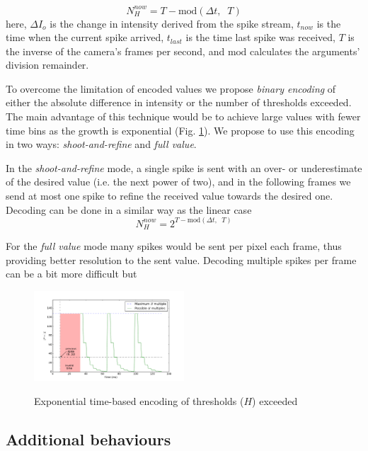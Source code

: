 \documentclass[twocolumn]{article}
\begin{document}
\begin{equation}
 N_{H}^{now} = T - \mathrm{mod}\left(\Delta t, \;\; T\right)
 \label{eq:new_Nh_linear}
\end{equation}
here, $\Delta I_o$ is the change in intensity derived from the spike stream, $t_{now}$ is the time when the current spike arrived, $t_{last}$ is the time last spike was received, $T$ is the inverse of the camera's frames per second, and $\mathrm{mod}$ calculates the arguments' division remainder.

To overcome the limitation of encoded values we propose \textit{binary encoding} of either the absolute difference in intensity or the number of thresholds exceeded. The main advantage of this technique would be to achieve large values with fewer time bins as the growth is exponential (Fig. \ref{fig:exponential_time}). We propose to use this encoding in two ways: \textit{shoot-and-refine} and \textit{full value}. 

In the \textit{shoot-and-refine} mode, a single spike is sent with an over- or underestimate of the desired value (i.e. the next power of two), and in the following frames we send at most one spike to refine the received value towards the desired one. Decoding can be done in a similar way as the linear case
\begin{equation}
N_{H}^{now} = 2^{ T - \mathrm{mod}\left(\Delta t, \;\; T\right) }
\label{eq:new_Nh_exp}
\end{equation}

For the \textit{full value} mode many spikes would be sent per pixel each frame, thus providing better resolution to the sent value. Decoding multiple spikes per frame can be a bit more difficult but 

\begin{figure}[htb]
  \includegraphics[width=0.5\textwidth]{spike_stream_time_exp}
  \label{fig:exponential_time}
  \caption{Exponential time-based encoding of thresholds ($H$) exceeded}
\end{figure} 

\subsection{Additional behaviours}
\end{document}
